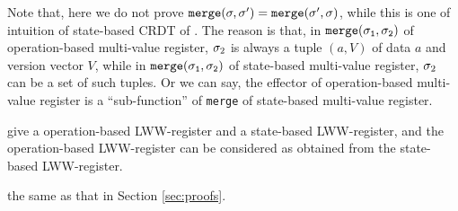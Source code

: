 
Note that, here we do not prove $\alabelshort[{\tt merge}]{\astate,\astate'} = \alabelshort[{\tt merge}]{\astate',\astate}$, while this is one of intuition of state-based CRDT of \cite{ShapiroPBZ11}. The reason is that, in $\alabelshort[{\tt merge}]{\astate_1,\astate_2}$ of operation-based multi-value register, $\astate_2$ is always a tuple $(a,V)$ of data $a$ and version vector $V$, while in $\alabelshort[{\tt merge}]{\astate_1,\astate_2}$ of state-based multi-value register, $\astate_2$ can be a set of such tuples. Or we can say, the effector of operation-based multi-value register is a ``sub-function'' of {\tt merge} of state-based multi-value register.





\cite{ShapiroPBZ11} give a operation-based LWW-register and a state-based LWW-register, and the operation-based LWW-register can be considered as obtained from the state-based LWW-register.

 the same as that in Section \ref{sec:proofs}.



